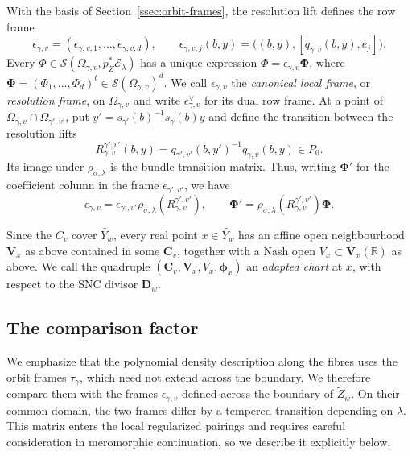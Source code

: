\documentclass[a4paper,12pt]{amsart}
\numberwithin{equation}{section}
\theoremstyle{definition}
\theoremstyle{remark}
\newcommand{\D}{\mathbf D}
\newcommand{\V}{\mathbf V}
\newcommand{\R}{\mathbb R}
\newcommand{\mcS}{\mathcal S}
\newcommand{\mcE}{\mathcal E}
\newcommand{\cC}{\mathbf C}
\begin{document}
With the basis of Section~\ref{ssec:orbit-frames}, the resolution lift defines the row frame
\[
 \epsilon_{\gamma,v}=(\epsilon_{\gamma,v,1},\dots,\epsilon_{\gamma,v,d}),\qquad
 \epsilon_{\gamma,v,j}(b,y)=\bigl((b,y),[q_{\gamma,v}(b,y),e_j]\bigr).
\]
Every $\Phi\in\mcS(\Omega_{\gamma,v},p_Z^*\mcE_\lambda)$ has a unique expression $\Phi=\epsilon_{\gamma,v}\boldsymbol\Phi$, where $\boldsymbol\Phi=(\Phi_1,\dots,\Phi_d)^t\in\mcS(\Omega_{\gamma,v})^d$. We call $\epsilon_{\gamma,v}$ the \emph{canonical local frame}, or \emph{resolution frame}, on $\Omega_{\gamma,v}$ and write $\epsilon_{\gamma,v}^\vee$ for its dual row frame. At a point of $\Omega_{\gamma,v}\cap\Omega_{\gamma',v'}$, put $y'=s_{\gamma'}(b)^{-1}s_\gamma(b)y$ and define the transition between the resolution lifts
\[
 R^{\gamma',v'}_{\gamma,v}(b,y)=q_{\gamma',v'}(b,y')^{-1}q_{\gamma,v}(b,y)\in P_0.
\]
Its image under $\rho_{\sigma,\lambda}$ is the bundle transition matrix. Thus, writing $\boldsymbol\Phi'$ for the coefficient column in the frame $\epsilon_{\gamma',v'}$, we have
\begin{equation}\label{eq:eps-transition}
 \epsilon_{\gamma,v}=\epsilon_{\gamma',v'}\rho_{\sigma,\lambda}(R^{\gamma',v'}_{\gamma,v}),\qquad
 \boldsymbol\Phi'=\rho_{\sigma,\lambda}(R^{\gamma',v'}_{\gamma,v})\boldsymbol\Phi.
\end{equation}

Since the $C_v$ cover $\widetilde{Y_w}$, every real point $x\in\widetilde{Y_w}$ has an affine open neighbourhood $\V_x$ as above contained in some $\cC_v$, together with a Nash open $V_x\subset\V_x(\R)$ as above. We call the quadruple $(\cC_v,\V_x,V_x,\boldsymbol\phi_x)$ an \emph{adapted chart} at $x$, with respect to the SNC divisor $\D_w$.

\subsection{The comparison factor}\label{ssec:comparison}

We emphasize that the polynomial density description along the fibres uses the orbit frames $\tau_\gamma$, which need not extend across the boundary. We therefore compare them with the frames $\epsilon_{\gamma,v}$ defined across the boundary of $\tilde Z_w$. On their common domain, the two frames differ by a tempered transition depending on $\lambda$. This matrix enters the local regularized pairings and requires careful consideration in meromorphic continuation, so we describe it explicitly below.
\end{document}
